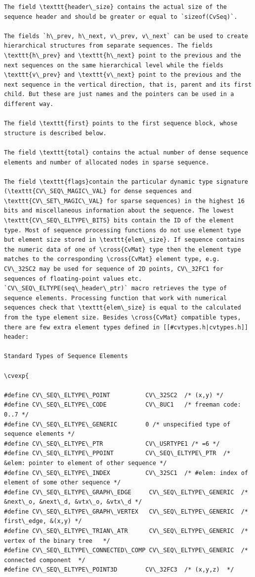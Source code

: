 \begin{verbatim}
The field \texttt{header\_size} contains the actual size of the sequence header and should be greater or equal to `sizeof(CvSeq)`.

The fields `h\_prev, h\_next, v\_prev, v\_next` can be used to create hierarchical structures from separate sequences. The fields \texttt{h\_prev} and \texttt{h\_next} point to the previous and the next sequences on the same hierarchical level while the fields \texttt{v\_prev} and \texttt{v\_next} point to the previous and the next sequence in the vertical direction, that is, parent and its first child. But these are just names and the pointers can be used in a different way.

The field \texttt{first} points to the first sequence block, whose structure is described below.

The field \texttt{total} contains the actual number of dense sequence elements and number of allocated nodes in sparse sequence.

The field \texttt{flags}contain the particular dynamic type signature (\texttt{CV\_SEQ\_MAGIC\_VAL} for dense sequences and \texttt{CV\_SET\_MAGIC\_VAL} for sparse sequences) in the highest 16 bits and miscellaneous information about the sequence. The lowest \texttt{CV\_SEQ\_ELTYPE\_BITS} bits contain the ID of the element type. Most of sequence processing functions do not use element type but element size stored in \texttt{elem\_size}. If sequence contains the numeric data of one of \cross{CvMat} type then the element type matches to the corresponding \cross{CvMat} element type, e.g. CV\_32SC2 may be used for sequence of 2D points, CV\_32FC1 for sequences of floating-point values etc. `CV\_SEQ\_ELTYPE(seq\_header\_ptr)` macro retrieves the type of sequence elements. Processing function that work with numerical sequences check that \texttt{elem\_size} is equal to the calculated from the type element size. Besides \cross{CvMat} compatible types, there are few extra element types defined in [[#cvtypes.h|cvtypes.h]] header:

Standard Types of Sequence Elements

\cvexp{

#define CV\_SEQ\_ELTYPE\_POINT          CV\_32SC2  /* (x,y) */
#define CV\_SEQ\_ELTYPE\_CODE           CV\_8UC1   /* freeman code: 0..7 */
#define CV\_SEQ\_ELTYPE\_GENERIC        0 /* unspecified type of sequence elements */
#define CV\_SEQ\_ELTYPE\_PTR            CV\_USRTYPE1 /* =6 */
#define CV\_SEQ\_ELTYPE\_PPOINT         CV\_SEQ\_ELTYPE\_PTR  /* &elem: pointer to element of other sequence */
#define CV\_SEQ\_ELTYPE\_INDEX          CV\_32SC1  /* #elem: index of element of some other sequence */
#define CV\_SEQ\_ELTYPE\_GRAPH\_EDGE     CV\_SEQ\_ELTYPE\_GENERIC  /* &next\_o, &next\_d, &vtx\_o, &vtx\_d */
#define CV\_SEQ\_ELTYPE\_GRAPH\_VERTEX   CV\_SEQ\_ELTYPE\_GENERIC  /* first\_edge, &(x,y) */
#define CV\_SEQ\_ELTYPE\_TRIAN\_ATR      CV\_SEQ\_ELTYPE\_GENERIC  /* vertex of the binary tree   */
#define CV\_SEQ\_ELTYPE\_CONNECTED\_COMP CV\_SEQ\_ELTYPE\_GENERIC  /* connected component  */
#define CV\_SEQ\_ELTYPE\_POINT3D        CV\_32FC3  /* (x,y,z)  */


\end{verbatim}
